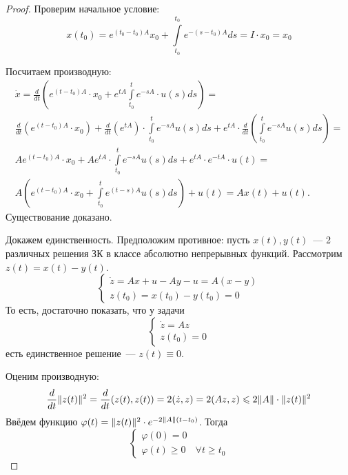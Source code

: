 \begin{proof}
    Проверим начальное условие:
    \begin{equation*}
        x(t_0) = e^{(t_0 - t_0)A}x_0 + \int\limits_{t_0}^{t_0} e^{-(s - t_0)A} ds = I \cdot x_0 = x_0
    \end{equation*}

    Посчитаем производную:
    \begin{multline*}
        \dot{x} = \frac{d}{dt} \left( e^{(t - t_0)A} \cdot x_0 + e^{tA} \int\limits_{t_0}^{t} e^{-sA} \cdot u(s) ds \right) = \\
        \frac{d}{dt} \left( e^{(t - t_0)A} \cdot x_0 \right) + 
        \frac{d}{dt} \left( e^{tA} \right) \cdot \int\limits_{t_0}^{t} e^{-sA} u(s) ds + 
        e^{tA} \cdot \frac{d}{dt} \left( \int\limits_{t_0}^{t} e^{-sA} u(s) ds \right) = \\
        Ae^{(t - t_0)A} \cdot x_0 + Ae^{tA} \cdot \int\limits_{t_0}^{t} e^{-sA} u(s) ds + e^{tA} \cdot e^{-tA} \cdot u(t) = \\
        A \left( e^{(t-t_0)A} \cdot x_0 + \int\limits_{t_0}^{t} e^{(t - s)A} u(s) ds \right) + u(t) = Ax(t) + u(t).
    \end{multline*}
    Существование доказано.

    Докажем единственность.
    Предположим противное: пусть $x(t), y(t)$~--- 2 различных решения ЗК в классе абсолютно непрерывных функций.
    Рассмотрим $z(t) = x(t) - y(t)$.
    \begin{equation*}
        \begin{cases}
            \dot{z} = Ax + u - Ay - u = A(x - y) \\
            z(t_0) = x(t_0) - y(t_0) = 0
        \end{cases}
    \end{equation*}
    То есть, достаточно показать, что у задачи
    \begin{equation*}
        \begin{cases}
            \dot{z} = Az \\
            z(t_0) = 0
        \end{cases}
    \end{equation*}
    есть единственное решение~--- $z(t) \equiv 0$.

    Оценим производную:
    \begin{equation*}
        \frac{d}{dt} \lVert z(t) \rVert^2 = \frac{d}{dt} (z(t), z(t)) = 
        2(\dot{z}, z) = 2(Az, z) \leqslant 2 \lVert A \rVert \cdot \lVert z(t) \rVert^2
    \end{equation*}
    Ввёдем функцию $\varphi(t) = \lVert z(t) \rVert^2 \cdot e^{- 2 \lVert A \rVert (t - t_0)}$.
    Тогда
    \begin{equation*}
        \begin{cases}
            \varphi(0) = 0 \\
            \varphi(t) \geqslant 0 \quad \forall t \geqslant t_0
        \end{cases}
    \end{equation*}


\end{proof}
